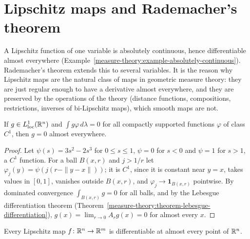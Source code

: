 \section{Lipschitz maps and Rademacher's theorem}\label{measure-theory:section-rademacher}

A Lipschitz function of one variable is absolutely continuous, hence differentiable almost everywhere (Example~\ref{measure-theory:example-absolutely-continuous}). Rademacher's theorem extends
this to several variables. It is the reason why Lipschitz maps are the natural class of maps in geometric measure theory: they are just regular enough to have a derivative almost everywhere,
and they are preserved by the operations of the theory (distance functions, compositions, restrictions, inverses of bi-Lipschitz maps), which smooth maps are not.

\begin{lemma}\label{measure-theory:lemma-vanishing-integrals}
If $g \in L^1_{\mathrm{loc}}(\mathbb{R}^n)$ and $\int g\varphi\,d\lambda = 0$ for all compactly supported functions $\varphi$ of class $C^1$, then $g = 0$ almost everywhere.
\end{lemma}

\begin{proof}
Let $\psi(s) = 3s^2 - 2s^3$ for $0 \leq s \leq 1$, $\psi = 0$ for $s < 0$ and $\psi = 1$ for $s > 1$, a $C^1$ function. For a ball $B(x, r)$ and $j > 1/r$ let
$\varphi_j(y) = \psi(j(r - \|y - x\|))$; it is $C^1$, since it is constant near $y = x$, takes values in $[0, 1]$, vanishes outside $B(x, r)$, and $\varphi_j \to \mathbf{1}_{B(x, r)}$
pointwise. By dominated convergence $\int_{B(x, r)}g = 0$ for all balls, and by the Lebesgue differentiation theorem (Theorem~\ref{measure-theory:theorem-lebesgue-differentiation}),
$g(x) = \lim_{r \to 0}A_rg(x) = 0$ for almost every $x$.
\end{proof}

\begin{theorem}[Rademacher]\label{measure-theory:theorem-rademacher}
Every Lipschitz map $f \colon \mathbb{R}^n \to \mathbb{R}^m$ is differentiable at almost every point of $\mathbb{R}^n$.
\end{theorem}

